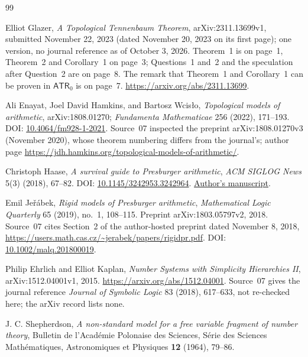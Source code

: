 \documentclass[11pt]{article}
\numberwithin{equation}{section}
\theoremstyle{definition}
\theoremstyle{remark}
\begin{document}
\clearpage
\begin{thebibliography}{99}
\small\raggedright

Elliot Glazer,
\emph{A Topological Tennenbaum Theorem},
arXiv:2311.13699v1, submitted November 22, 2023 (dated November 20, 2023 on
its first page); one version, no journal reference as of October 3, 2026.
Theorem~1 is on page~1, Theorem~2 and Corollary~1 on page~3; Questions~1 and~2 and the
speculation after Question~2 are on page~8. The remark that Theorem~1 and
Corollary~1 can be proven in $\mathsf{ATR}_0$ is on page~7.
\url{https://arxiv.org/abs/2311.13699}.

Ali Enayat, Joel David Hamkins, and Bartosz Wcis\l o,
\emph{Topological models of arithmetic},
arXiv:1808.01270; \emph{Fundamenta Mathematicae} 256 (2022), 171--193.
DOI: \href{https://doi.org/10.4064/fm928-1-2021}{10.4064/fm928-1-2021}.
Source~07 inspected the preprint arXiv:1808.01270v3 (November 2020), whose
theorem numbering differs from the journal's; author page
\url{https://jdh.hamkins.org/topological-models-of-arithmetic/}.

Christoph Haase,
\emph{A survival guide to Presburger arithmetic},
\emph{ACM SIGLOG News} 5(3) (2018), 67--82.
DOI: \href{https://doi.org/10.1145/3242953.3242964}{10.1145/3242953.3242964}.
\href{https://www.cs.ox.ac.uk/people/christoph.haase/home/publication/haa-18/haa-18.pdf}{Author's manuscript}.

Emil Je\v r\'abek,
\emph{Rigid models of Presburger arithmetic},
\emph{Mathematical Logic Quarterly} 65 (2019), no.~1, 108--115.
Preprint arXiv:1803.05797v2, 2018. Source~07 cites Section~2 of the
author-hosted preprint dated November 8, 2018,
\url{https://users.math.cas.cz/~jerabek/papers/rigidpr.pdf}.
DOI: \href{https://doi.org/10.1002/malq.201800019}{10.1002/malq.201800019}.

Philip Ehrlich and Elliot Kaplan,
\emph{Number Systems with Simplicity Hierarchies II},
arXiv:1512.04001v1, 2015.
\url{https://arxiv.org/abs/1512.04001}. Source~07 gives the journal
reference \emph{Journal of Symbolic Logic} 83 (2018), 617--633, not
re-checked here; the arXiv record lists none.

J. C. Shepherdson, \emph{A non-standard model for a free variable fragment of
number theory}, Bulletin de l'Acad\'emie Polonaise des Sciences, S\'erie des
Sciences Math\'ematiques, Astronomiques et Physiques \textbf{12} (1964), 79--86.


\end{thebibliography}
\end{document}
